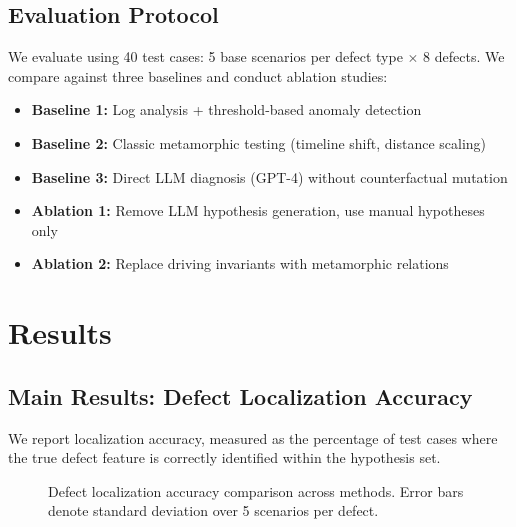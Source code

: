 \documentclass[conference]{IEEEtran}
\theoremstyle{plain}
\begin{document}
\subsection{Evaluation Protocol}
We evaluate using 40 test cases: 5 base scenarios per defect type $\times$ 8 defects. We compare against three baselines and conduct ablation studies:
\begin{itemize}
    \item \textbf{Baseline 1:} Log analysis + threshold-based anomaly detection
    \item \textbf{Baseline 2:} Classic metamorphic testing (timeline shift, distance scaling)
    \item \textbf{Baseline 3:} Direct LLM diagnosis (GPT-4) without counterfactual mutation
    \item \textbf{Ablation 1:} Remove LLM hypothesis generation, use manual hypotheses only
    \item \textbf{Ablation 2:} Replace driving invariants with metamorphic relations
\end{itemize}

\section{Results}
\label{sec:results}

\subsection{Main Results: Defect Localization Accuracy}
We report localization accuracy, measured as the percentage of test cases where the true defect feature is correctly identified within the hypothesis set.

\begin{figure}[t]
\centering
{}
\caption{Defect localization accuracy comparison across methods. Error bars denote standard deviation over 5 scenarios per defect.}
\label{fig:accuracy}
\end{figure}
\end{document}
